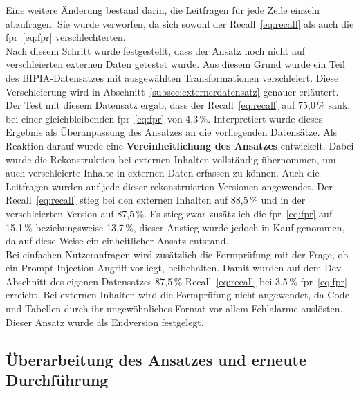 Eine weitere Änderung bestand darin, die Leitfragen für jede Zeile einzeln abzufragen. Sie wurde verworfen, da sich sowohl der Recall~\eqref{eq:recall} als auch die \ac{fpr}~\eqref{eq:fpr} 
verschlechterten. \\
Nach diesem Schritt wurde festgestellt, dass der Ansatz noch nicht auf verschleierten externen Daten getestet wurde. Aus diesem Grund wurde ein Teil des 
BIPIA-Datensatzes mit ausgewählten Transformationen verschleiert. Diese Verschleierung wird in Abschnitt~\ref{subsec:externerdatensatz} genauer erläutert. 
Der Test mit diesem Datensatz ergab, dass der Recall~\eqref{eq:recall} auf 75,0\,\% sank, bei einer gleichbleibenden \ac{fpr}~\eqref{eq:fpr} von 4,3\,\%. Interpretiert wurde dieses Ergebnis als Überanpassung des Ansatzes an die
vorliegenden Datensätze. 
Als Reaktion darauf wurde eine \textbf{Vereinheitlichung des Ansatzes} entwickelt. Dabei wurde die Rekonstruktion bei externen Inhalten
vollständig übernommen, um auch verschleierte Inhalte in externen Daten erfassen zu können. Auch die Leitfragen wurden auf jede dieser rekonstruierten Versionen angewendet. 
Der Recall~\eqref{eq:recall} stieg bei den externen Inhalten auf 88,5\,\% und in der verschleierten Version auf 87,5\,\%. Es stieg zwar zusätzlich die \ac{fpr}~\eqref{eq:fpr} auf 15,1\,\% 
beziehungsweise 13,7\,\%, dieser Anstieg wurde jedoch in Kauf genommen, da auf diese Weise ein einheitlicher Ansatz entstand. \\
Bei einfachen Nutzeranfragen wird zusätzlich die Formprüfung mit der Frage, ob ein Prompt-Injection-Angriff vorliegt, beibehalten.
Damit wurden auf dem Dev-Abschnitt des eigenen Datensatzes 87,5\,\% Recall~\eqref{eq:recall} bei 3,5\,\% \ac{fpr}~\eqref{eq:fpr} erreicht. Bei externen Inhalten
wird die Formprüfung nicht angewendet, da Code und Tabellen durch ihr ungewöhnliches Format vor allem Fehlalarme auslösten. Dieser Ansatz wurde als Endversion festgelegt.

\subsection{Überarbeitung des Ansatzes und erneute Durchführung}\label{subsec:ueberarbeitung} 

